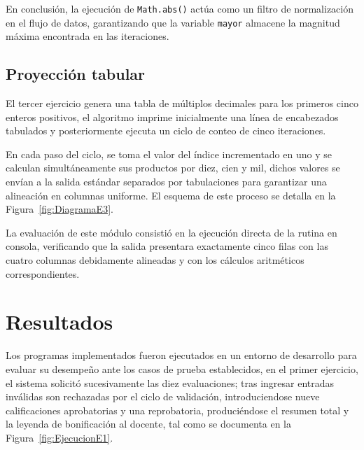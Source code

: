 En conclusión, la ejecución de \texttt{Math.abs()} actúa como un filtro de normalización en el flujo de datos, garantizando que la variable \texttt{mayor} almacene la magnitud máxima encontrada en las iteraciones.

\subsection{Proyección tabular}
El tercer ejercicio genera una tabla de múltiplos decimales para los primeros cinco enteros positivos, el algoritmo imprime inicialmente una línea de encabezados tabulados y posteriormente ejecuta un ciclo de conteo de cinco iteraciones. 

En cada paso del ciclo, se toma el valor del índice incrementado en uno y se calculan simultáneamente sus productos por diez, cien y mil, dichos valores se envían a la salida estándar separados por tabulaciones para garantizar una alineación en columnas uniforme. El esquema de este proceso se detalla en la Figura~\ref{fig:DiagramaE3}.


La evaluación de este módulo consistió en la ejecución directa de la rutina en consola, verificando que la salida presentara exactamente cinco filas con las cuatro columnas debidamente alineadas y con los cálculos aritméticos correspondientes.

\section{Resultados}

Los programas implementados fueron ejecutados en un entorno de desarrollo para evaluar su desempeño ante los casos de prueba establecidos, en el primer ejercicio, el sistema solicitó sucesivamente las diez evaluaciones; tras ingresar entradas inválidas son rechazadas por el ciclo de validación, introduciendose nueve calificaciones aprobatorias y una reprobatoria, produciéndose el resumen total y la leyenda de bonificación al docente, tal como se documenta en la Figura~\ref{fig:EjecucionE1}.




\clearpage

